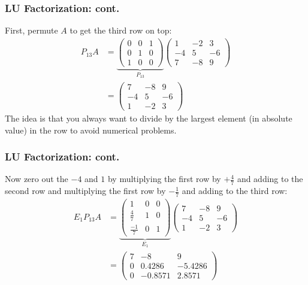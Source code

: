 \documentclass{beamer}
\begin{document}
\begin{frame}\frametitle{LU Factorization: cont.}
	First, permute $A$ to get the third row on top:
	\begin{align*}
		P_{13}A &= \underbrace{\begin{pmatrix}
						0 & 0 & 1\\
						0 & 1 & 0\\
						1 & 0 & 0
					\end{pmatrix}}_{P_{13}}
					\begin{pmatrix}
    					1 & -2 & 3\\
    					-4 & 5 & -6\\
    					7 & -8 & 9
    				\end{pmatrix} \\
    			&= \begin{pmatrix}
    					7 & -8 & 9\\
    					-4 & 5 & -6\\
    					1 & -2 & 3
    				\end{pmatrix}
    \end{align*}
	The idea is that you always want to divide by the largest element (in absolute value) in the row to avoid numerical problems.
\end{frame}

\begin{frame}\frametitle{LU Factorization: cont.}
	Now zero out the $-4$ and $1$ by multiplying the first row by $+\frac{4}{7}$ and adding to the second row and multiplying the first row by 
	$-\frac{1}{7}$ and adding to the third row:
	\begin{align*}
		E_1 P_{13}A 
		&= 
			\underbrace{\begin{pmatrix}
    			1 & 0 & 0\\
    			\frac{4}{7} & 1 & 0\\
    			\frac{-1}{7} & 0 & 1
  			\end{pmatrix}}_{E_1}
			\begin{pmatrix}
    			7 & -8 & 9\\
    			-4 & 5 & -6\\
    			1 & -2 & 3
  			\end{pmatrix} \\
		&=
			\begin{pmatrix}
    			7 & -8 & 9\\
    			0 & 0.4286 & -5.4286\\
    			0 & -0.8571 & 2.8571
  			\end{pmatrix}
	\end{align*}
\end{frame}
\end{document}
